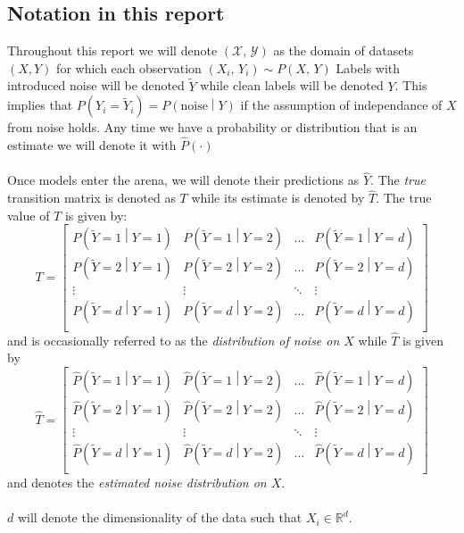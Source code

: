\documentclass{article} %
\newcommand{\PR}[1]{{P\left(#1\right)}}
\newcommand{\PRh}[1]{{\widehat P\left(#1\right)}}
\newcommand{\Yh}{\widehat{Y}}
\newcommand{\Th}{\widehat{T}}
\newcommand{\Yn}{\widetilde{Y}}
\newcommand{\noiseassumption}{assumption of independance of $X$ from noise }
\begin{document}
\subsection{Notation in this report}
Throughout this report we will denote $(\mathcal X,\,\mathcal Y)$ as the domain of datasets $(X, Y)$ for which each observation $(X_i,\,Y_i) \sim \PR{X,\,Y}$
Labels with introduced noise will be denoted $\Yn$ while clean labels will be denoted $Y$. This implies that $\PR{Y_i = \Yn_i} = \PR{\mbox{noise}\middle|Y}$ if the \noiseassumption holds.
Any time we have a probability or distribution that is an estimate we will denote it with $\PRh{\cdot}$
\\\\
Once models enter the arena, we will denote their predictions as $\Yh$. The \emph{true} transition matrix is denoted as $T$ while its estimate is denoted by $\Th$.
The true value of $T$ is given by:
\begin{equation}
\label{eqn:true_transition}
T = \begin{bmatrix} 
    \PR{\Yn=1\middle|Y=1} & \PR{\Yn=1\middle|Y=2} & \dots & \PR{\Yn=1\middle|Y=d}\\
    \PR{\Yn=2\middle|Y=1} & \PR{\Yn=2\middle|Y=2} & \dots & \PR{\Yn=2\middle|Y=d}\\
    \vdots                & \vdots                &\ddots & \vdots               \\
    \PR{\Yn=d\middle|Y=1} & \PR{\Yn=d\middle|Y=2} & \dots & \PR{\Yn=d\middle|Y=d}\\
\end{bmatrix}
\end{equation}
and is occasionally referred to as the \emph{distribution of noise on $X$} while $\Th$ is given by
\begin{equation}
\label{eqn:est_transition}
\Th = \begin{bmatrix} 
    \PRh{\Yn=1\middle|Y=1} & \PRh{\Yn=1\middle|Y=2} & \dots & \PRh{\Yn=1\middle|Y=d}\\
    \PRh{\Yn=2\middle|Y=1} & \PRh{\Yn=2\middle|Y=2} & \dots & \PRh{\Yn=2\middle|Y=d}\\
    \vdots                 & \vdots                 &\ddots & \vdots                \\
    \PRh{\Yn=d\middle|Y=1} & \PRh{\Yn=d\middle|Y=2} & \dots & \PRh{\Yn=d\middle|Y=d}\\
\end{bmatrix}
\end{equation}
and denotes the \emph{estimated noise distribution on $X$}.
\\\\
$d$ will denote the dimensionality of the data such that $X_i \in \mathbb R^d$.
    
\end{document}
